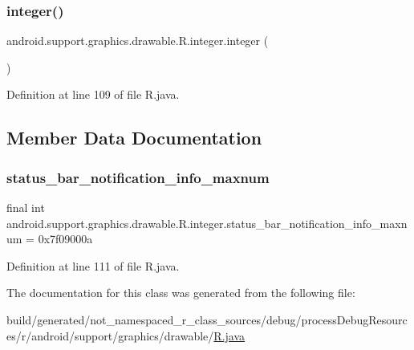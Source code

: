 \subsubsection{\texorpdfstring{integer()}{integer()}}
{\footnotesize\ttfamily android.\+support.\+graphics.\+drawable.\+R.\+integer.\+integer (\begin{DoxyParamCaption}{ }\end{DoxyParamCaption})\hspace{0.3cm}{\ttfamily [private]}}



Definition at line 109 of file R.\+java.


\begin{DoxyCode}{0}

\end{DoxyCode}


\subsection{Member Data Documentation}
\mbox{\label{classandroid_1_1support_1_1graphics_1_1drawable_1_1_r_1_1integer_a3940dbc80d681bc0c63c0e82e05868c6}} 
\subsubsection{\texorpdfstring{status\_bar\_notification\_info\_maxnum}{status\_bar\_notification\_info\_maxnum}}
{\footnotesize\ttfamily final int android.\+support.\+graphics.\+drawable.\+R.\+integer.\+status\+\_\+bar\+\_\+notification\+\_\+info\+\_\+maxnum = 0x7f09000a\hspace{0.3cm}{\ttfamily [static]}}



Definition at line 111 of file R.\+java.



The documentation for this class was generated from the following file\+:\begin{DoxyCompactItemize}
\item 
build/generated/not\+\_\+namespaced\+\_\+r\+\_\+class\+\_\+sources/debug/process\+Debug\+Resources/r/android/support/graphics/drawable/\mbox{\hyperlink{android_2support_2graphics_2drawable_2_r_8java}{R.\+java}}\end{DoxyCompactItemize}
